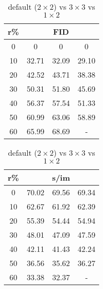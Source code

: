 \begin{table}[htp]
\caption{default ($2 \times 2$) vs $3 \times 3$ vs $1 \times 2$}
\label{table:exp_3}
    \begin{minipage}{0.48\textwidth}
        \centering
        \begin{tabular}{|c||c|c|c|}
            \hline
            \multicolumn{1}{|c||}{r\%} & \multicolumn{3}{c|}{FID}\\
            \hline
            0 & 0 & 0 & 0 \\
            10 & 32.71 & 32.09 & 29.10 \\
            20 & 42.52 & 43.71 & 38.38 \\
            30 & 50.31 & 51.80 & 45.69 \\
            40 & 56.37 & 57.54 & 51.33 \\
            50 & 60.99 & 63.06 & 58.89 \\
            60 & 65.99 & 68.69 & - \\
            \hline
        \end{tabular}
    \end{minipage}
    \hfill
    \begin{minipage}{0.48\textwidth}
        \centering
        \begin{tabular}{|c||c|c|c|}
            \hline
            \multicolumn{1}{|c||}{r\%} & \multicolumn{3}{c|}{s/im}\\
            \hline
            0 & 70.02 & 69.56 & 69.34 \\
            10 & 62.67 & 61.92 & 62.39 \\
            20 & 55.39 & 54.44 & 54.94 \\
            30 & 48.01 & 47.09 & 47.59 \\
            40 & 42.11 & 41.43 & 42.24 \\
            50 & 36.56 & 35.62 & 36.27 \\
            60 & 33.38 & 32.37 & - \\
            \hline
        \end{tabular}
    \end{minipage}
\end{table}